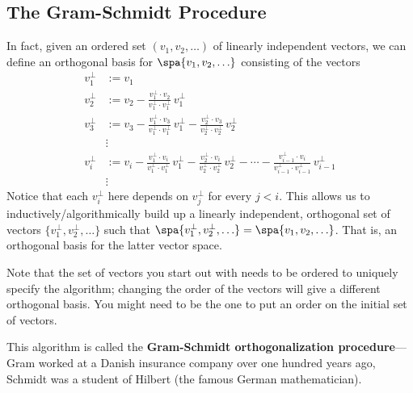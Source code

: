 \subsection{The Gram-Schmidt Procedure}
In fact, given an ordered set $(v_1, v_2, \ldots )$ of linearly independent vectors, we can define an orthogonal basis for $\spa \{v_1,v_2, \ldots \}$ consisting of the  vectors
\begin{align*}
v_1^\perp&:=v_1 \\
v_2^\perp &:= v_2 - \frac{v_1^\perp\cdot v_2}{v_1^\perp\cdot v_1^\perp}\,v_1^\perp \\
v_3^\perp &:= v_3 - \frac{v_1^\perp\cdot v_3}{v_1^\perp\cdot v_1^\perp}\,v_1^\perp - \frac{v_2^\perp\cdot v_3}{v_2^\perp\cdot v_2^\perp}\,v_2^\perp\\
&\vdots \\
v_i^\perp%
 &:= v_i - \frac{v_1^\perp\cdot v_i}{v_1^\perp\cdot v_1^\perp}\,v_1^\perp   
 - \frac{v_2^\perp\cdot v_i}{v_2^\perp\cdot v_2^\perp}\,v_2^\perp -\cdots
 - \frac{v_{i-1}^\perp\cdot v_i}{v_{i-1}^\perp\cdot v_{i-1}^\perp}\,v_{i-1}^\perp\\
&\vdots
\end{align*}
Notice that each $v_i^\perp$ here depends on  $v_j^\perp$ for every $j<i$.  This allows us to inductively/algorithmically build up a linearly independent, orthogonal set of vectors 
$\{v_1^\perp,v_2^\perp, \ldots \}$ 
such that 
$\spa \{v_1^\perp,v_2^\perp, \ldots \}=\spa \{v_1, v_2, \ldots \}$. 
That is, an orthogonal basis for the latter vector space. 

Note that the set of vectors you start out with needs to be ordered to uniquely specify the algorithm; changing the order of the vectors will give a different orthogonal basis. You might need to be the one to put an order on the initial set of vectors.

This algorithm is called the {\bfseries Gram-Schmidt orthogonalization procedure}\label{GramSchmidt}---Gram worked at a Danish insurance company over one hundred years ago, Schmidt was a student of Hilbert (the famous German mathematician).

